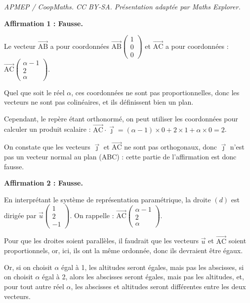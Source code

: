 \documentclass[10pt]{article}
\providecommand{\vect}[1]{\overrightarrow{#1}}
\begin{document}
\noindent\textit{APMEP / CoopMaths. CC BY-SA. Présentation adaptée par Maths Explorer.}\par\medskip
\medskip

\textbf{Affirmation 1 : Fausse.}

Le vecteur $ \vect{\mathrm{AB}} $ a pour coordonnées $ \vect{\mathrm{AB}}\begin{pmatrix} 1 \\ 0 \\ 0\end{pmatrix} $ et $ \vect{\mathrm{AC}} $ a pour coordonnées : $ \vect{\mathrm{AC}}\begin{pmatrix} \alpha - 1 \\2\\\alpha \end{pmatrix} $.

Quel que soit le réel $\alpha$, ces coordonnées ne sont pas proportionnelles, donc les vecteurs ne sont pas colinéaires, et ils définissent bien un plan.

Cependant, le repère étant orthonormé, on peut utiliser les coordonnées pour calculer un produit scalaire : \quad
$ \vect{\mathrm{AC}}\cdot\vect{\jmath} = (\alpha-1)\times 0 + 2 \times 1 + \alpha \times 0 = 2$.

On constate que les vecteurs $ \vect{\jmath} $ et $ \vect{\mathrm{AC}} $ ne sont pas orthogonaux, donc $ \vect{\jmath} $ n'est pas un vecteur normal au plan (ABC) : cette partie de l'affirmation est donc fausse.

\medskip

\textbf{Affirmation 2 : Fausse.}

En interprétant le système de représentation paramétrique, la droite $(d)$ est dirigée par $\vect{u} \begin{pmatrix}1 \\ 2  \\ -1 \end{pmatrix}$. On rappelle : $ \vect{\mathrm{AC}}\begin{pmatrix} \alpha - 1 \\2\\\alpha \end{pmatrix} $.

Pour que les droites soient parallèles, il faudrait que les vecteurs $ \vect{u} $ et $ \vect{\mathrm{AC}} $ soient proportionnels, or, ici, ils ont la même ordonnée, donc ils devraient être égaux.

Or, si on choisit $\alpha$ égal à 1, les altitudes seront égales, mais pas les abscisses, si on choisit $\alpha$ égal à 2, alors les abscisses seront égales, mais pas les altitudes, et, pour tout autre réel $\alpha$, les abscisses et altitudes seront différentes entre les deux vecteurs.
\end{document}

